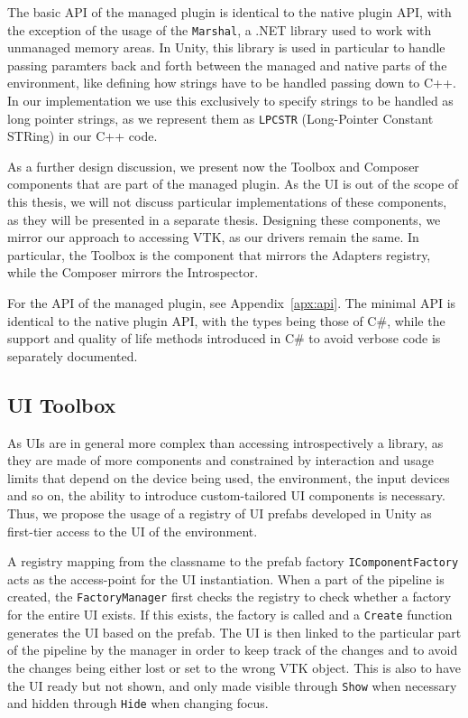 The basic API of the managed plugin is identical to the native plugin API, with the exception of the usage of the \verb|Marshal|, a .NET library used to work with unmanaged memory areas. In Unity, this library is used in particular to handle passing paramters back and forth between the managed and native parts of the environment, like defining how strings have to be handled passing down to C++. In our implementation we use this exclusively to specify strings to be handled as long pointer strings, as we represent them as \verb|LPCSTR| (Long-Pointer Constant STRing) in our C++ code.

As a further design discussion, we present now the Toolbox and Composer components that are part of the managed plugin. As the UI is out of the scope of this thesis, we will not discuss particular implementations of these components, as they will be presented in a separate thesis. Designing these components, we mirror our approach to accessing VTK, as our drivers remain the same. In particular, the Toolbox is the component that mirrors the Adapters registry, while the Composer mirrors the Introspector.

For the API of the managed plugin, see Appendix~\ref{apx:api}. The minimal API is identical to the native plugin API, with the types being those of C\#, while the support and quality of life methods introduced in C\# to avoid verbose code is separately documented.

\subsection{UI Toolbox}
\label{sec:design-toolbox}

As UIs are in general more complex than accessing introspectively a library, as they are made of more components and constrained by interaction and usage limits that depend on the device being used, the environment, the input devices and so on, the ability to introduce custom-tailored UI components is necessary. Thus, we propose the usage of a registry of UI prefabs developed in Unity as first-tier access to the UI of the environment.

A registry mapping from the classname to the prefab factory \verb|IComponentFactory| acts as the access-point for the UI instantiation. When a part of the pipeline is created, the \verb|FactoryManager| first checks the registry to check whether a factory for the entire UI exists. If this exists, the factory is called and a \verb|Create| function generates the UI based on the prefab. The UI is then linked to the particular part of the pipeline by the manager in order to keep track of the changes and to avoid the changes being either lost or set to the wrong VTK object. This is also to have the UI ready but not shown, and only made visible through \verb|Show| when necessary and hidden through \verb|Hide| when changing focus.

